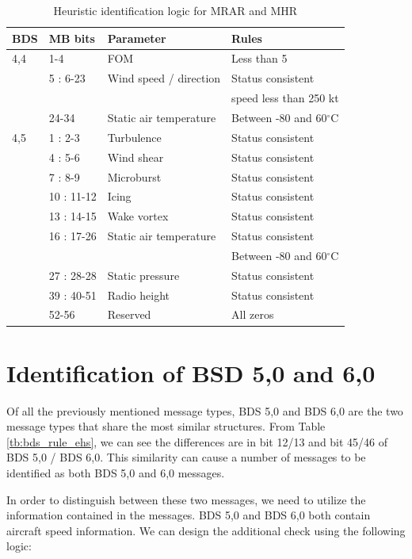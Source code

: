\begin{table}
\footnotesize
\centering
\small
\caption{Heuristic identification logic for MRAR and MHR}
\label{tb:bds_rule_mrar}
\begin{tabular}{|l|l|l|l|}
\hline
\textbf{BDS} & \textbf{MB bits} & \textbf{Parameter} & \textbf{Rules} \\ \hline \hline
4,4 & 1-4 & FOM & Less than 5 \\ \cline{2-4} 
& 5 : 6-23 & Wind speed / direction & Status consistent \\ 
& & & speed less than 250 kt \\ \cline{2-4} 
& 24-34 & Static air temperature & Between -80 and 60$^\circ$C \\ \hline \hline
4,5 & 1 : 2-3 & Turbulence & Status consistent \\ \cline{2-4} 
& 4 : 5-6 & Wind shear & Status consistent \\ \cline{2-4} 
& 7 : 8-9 & Microburst & Status consistent \\ \cline{2-4} 
& 10 : 11-12 & Icing & Status consistent \\ \cline{2-4} 
& 13 : 14-15 & Wake vortex & Status consistent \\ \cline{2-4} 
& 16 : 17-26 & Static air temperature & Status consistent \\
& & & Between -80 and 60$^\circ$C \\ \cline{2-4} 
& 27 : 28-28 & Static pressure & Status consistent \\ \cline{2-4} 
& 39 : 40-51 & Radio height & Status consistent \\ \cline{2-4} 
& 52-56 & Reserved & All zeros \\ \hline
\end{tabular}
\end{table}




\section{Identification of BSD 5,0 and 6,0}

Of all the previously mentioned message types, BDS 5,0 and BDS 6,0 are the two message types that share the most similar structures. From Table \ref{tb:bds_rule_ehs}, we can see the differences are in bit 12/13 and bit 45/46 of BDS 5,0 / BDS 6,0. This similarity can cause a number of messages to be identified as both BDS 5,0 and 6,0 messages.

In order to distinguish between these two messages, we need to utilize the information contained in the messages. BDS 5,0 and BDS 6,0 both contain aircraft speed information. We can design the additional check using the following logic:

